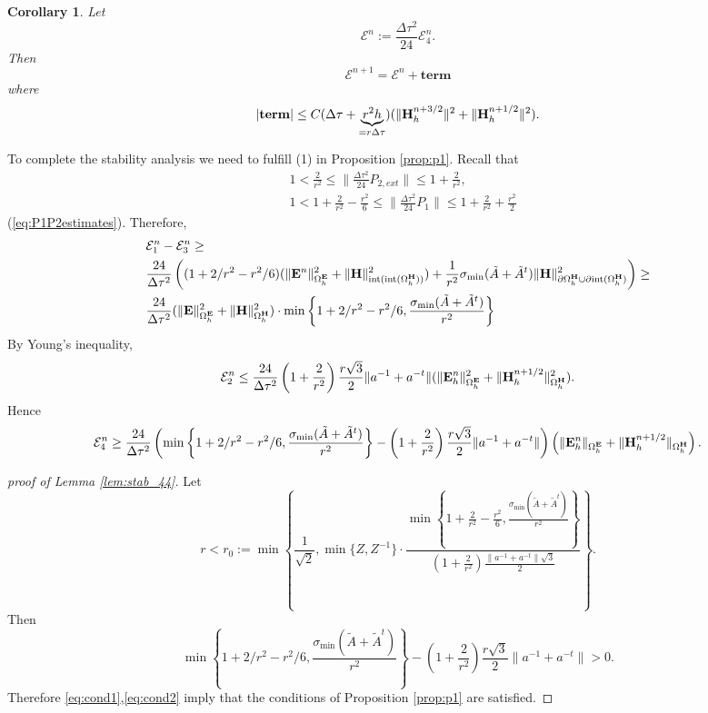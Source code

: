 \documentclass[12pt,reqno]{amsart}
\newcommand{\e}{{\bf E}}
\newcommand{\h}{{\bf H}}
\newtheorem{cor}[theorem]{Corollary}
\theoremstyle{definition}
\numberwithin{equation}{section}
\newcommand{\intr}[1]{\mathrm{int}(#1)}
\def\Gwh{\Omega_h}
\begin{document}
\begin{cor}
	Let 
	$$
	\mathcal{E}^n:=\frac{\Delta \tau^2}{24}\mathcal{E}_4^n.
	$$
	Then 
	$$
	\mathcal{E}^{n+1}=	\mathcal{E}^n+\mathbf{term}
	$$
	where 
	\begin{equation}\label{eq:cond1}
	|\mathbf{term}|\leq C(\Delta \tau  +\underbrace{r^2h}_{=r\Delta \tau})(\| \h_h^{n+3/2}\|^2+\|\h_h^{n+1/2}\|^2).
	\end{equation}
\end{cor}
To complete the stability analysis we need to fulfill (1) in Proposition \ref{prop:p1}.
Recall that  
\begin{align}
	&
	1<\frac{2}{r^2}\leq \|\frac{\Delta \tau^2}{24}P_{2,ext}\|\leq 1+\frac{2}{r^2},\\&
	1<1+\frac{2}{r^2}-\frac{r^2}{6}\leq\|\frac{\Delta \tau^2}{24}P_1\|\leq 1+\frac{2}{r^2}+\frac{r^2}{2}
\end{align} 
(\eqref{eq:P1P2estimates}).
Therefore,
\begin{align*}
	&
	\mathcal{E}_1^n-\mathcal{E}_3^n\geq\\&
	\frac{24}{\Delta \tau^2}\left ((1+2/r^2-r^2/6)(\|\e^n\|_{\Gwh^\e}^2
	+\|\h\|^2_{\intr{\intr{\Gwh^\h}}})+\frac{1}{r^2} \sigma_{\min}(\tilde{A}+\tilde{A}^t)
	\|\h\|^2_{\partial{\Gwh^\h}\cup \partial \intr{\Gwh^\h}}
	\right)\geq \\&
		\frac{24}{\Delta \tau^2}(\|\e\|^2_{\Gwh^\e}+\|\h\|_{\Gwh^\h}^2)\cdot 
		\min\left \{1+2/r^2-r^2/6,\frac{\sigma_{\min}(\tilde{A}+\tilde{A}^t)}{r^2}\right \}
\end{align*}
By Young's inequality,
$$
\mathcal{E}_2^n\leq \frac{24}{\Delta \tau^2}
\left(1+\frac{2}{r^2}\right)
\frac{r\sqrt{3}}{2}\|a^{-1}+a^{-t}\|(\|\e_h^n\|^2_{\Gwh^\e}+\|\h_h^{n+1/2}\|^2_{\Gwh^\h}).
$$
Hence
\begin{equation}\label{eq:cond2}
\mathcal{E}_4^n\geq 
\frac{24}{\Delta \tau^2}
\left(
		\min\left \{1+2/r^2-r^2/6,\frac{\sigma_{\min}(\tilde{A}+\tilde{A}^t)}{r^2}\right \}-\left(1+\frac{2}{r^2}\right)
		\frac{r\sqrt{3}}{2}\|a^{-1}+a^{-t}\|
	\right)
\left ( \|\e_h^n\|_{\Gwh^\e}+\|\h_h^{n+1/2}\|_{\Gwh^\h}\right).
\end{equation}

\begin{proof}[proof of Lemma \ref{lem:stab_44}]
Let 
 	$$
r<r_0:=\min \left \{  
\frac{1}{\sqrt{2}},\min\{Z,Z^{-1}\}\cdot
\frac
{ 	\min\left \{    
	1+\frac{2}{r^2}-\frac{r^2}{6},\frac{\sigma_{\min}(\tilde{A}+\tilde{A}^t)}{r^2}
	\right\}}
{\left(1+\frac{2}{r^2}\right)\frac{\|a^{-1}+a^{-t}\|\sqrt{3}}{2}}
\right \}.
$$
Then
$$
	\min\left \{1+2/r^2-r^2/6,\frac{\sigma_{\min}(\tilde{A}+\tilde{A}^t)}{r^2}\right \}-\left(1+\frac{2}{r^2}\right)
\frac{r\sqrt{3}}{2}\|a^{-1}+a^{-t}\|>0.
$$
Therefore \eqref{eq:cond1},\eqref{eq:cond2} imply that the conditions of Proposition \ref{prop:p1} are satisfied.
\end{proof}
\end{document}
